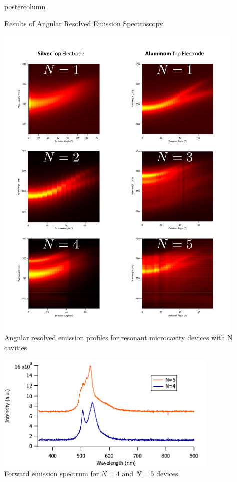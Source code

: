 \documentclass[final]{beamer}
\begin{document}
\begin{frame}
\begin{columns}
\begin{column}{.49\textwidth}
\begin{beamercolorbox}[center,wd=\textwidth]{postercolumn}
\begin{minipage}[T]{.99\textwidth}
{\begin{block}{Results of Angular Resolved Emission Spectroscopy}
\begin{minipage}{0.35\textwidth}
                \end{minipage}
                \begin{minipage}{0.6\textwidth}
                    \centering
                    \includegraphics[width=0.9\textwidth]{images/DFDG_Summary.pdf}\\
                    \small Angular resolved emission profiles for resonant microcavity devices with N cavities
                \end{minipage}
                \centering
                \includegraphics[width=0.8\textwidth]{images/n4n5.pdf}\\
                \small Forward emission spectrum for $N=4$ and $N=5$ devices


\end{block}}
\end{minipage}
\end{beamercolorbox}
\end{column}
\end{columns}
\end{frame}
\end{document}
